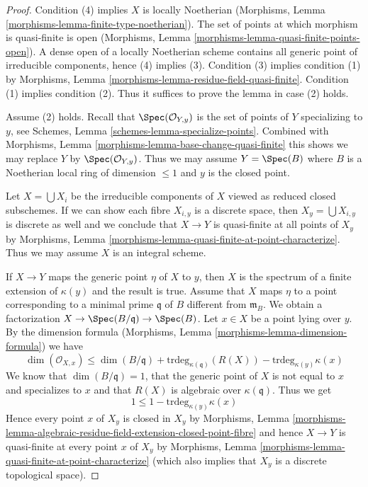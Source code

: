 \begin{proof}
Condition (4) implies $X$ is locally Noetherian
(Morphisms, Lemma \ref{morphisms-lemma-finite-type-noetherian}).
The set of points at which morphism is quasi-finite is open
(Morphisms, Lemma \ref{morphisms-lemma-quasi-finite-points-open}).
A dense open of a locally Noetherian scheme contains all generic
point of irreducible components, hence (4) implies (3).
Condition (3) implies condition
(1) by Morphisms, Lemma \ref{morphisms-lemma-residue-field-quasi-finite}.
Condition (1) implies condition (2).
Thus it suffices to prove the lemma in case (2) holds.

\medskip\noindent
Assume (2) holds. Recall that $\Spec(\mathcal{O}_{Y, y})$
is the set of points of $Y$ specializing to $y$, see
Schemes, Lemma \ref{schemes-lemma-specialize-points}.
Combined with
Morphisms, Lemma \ref{morphisms-lemma-base-change-quasi-finite}
this shows we may replace $Y$ by $\Spec(\mathcal{O}_{Y, y})$.
Thus we may assume $Y = \Spec(B)$ where $B$ is a Noetherian
local ring of dimension $\leq 1$ and $y$ is the closed point.

\medskip\noindent
Let $X = \bigcup X_i$ be the irreducible components of $X$ viewed
as reduced closed subschemes. If we can show each fibre $X_{i, y}$
is a discrete space, then $X_y = \bigcup X_{i, y}$ is discrete as
well and we conclude that $X \to Y$ is quasi-finite at all points
of $X_y$ by Morphisms, Lemma
\ref{morphisms-lemma-quasi-finite-at-point-characterize}.
Thus we may assume $X$ is an integral scheme.

\medskip\noindent
If $X \to Y$ maps the generic point $\eta$ of $X$ to $y$, then $X$
is the spectrum of a finite extension of $\kappa(y)$ and the
result is true. Assume that $X$ maps $\eta$ to a point corresponding
to a minimal prime $\mathfrak q$ of $B$ different from $\mathfrak m_B$.
We obtain a factorization $X \to \Spec(B/\mathfrak q) \to \Spec(B)$.
Let $x \in X$ be a point lying over $y$.
By the dimension formula
(Morphisms, Lemma \ref{morphisms-lemma-dimension-formula})
we have
$$
\dim(\mathcal{O}_{X, x}) \leq \dim(B/\mathfrak q) +
\text{trdeg}_{\kappa(\mathfrak q)}(R(X)) - \text{trdeg}_{\kappa(y)} \kappa(x)
$$
We know that $\dim(B/\mathfrak q) = 1$, that the generic point of $X$
is not equal to $x$ and specializes to $x$ and that $R(X)$ is algebraic
over $\kappa(\mathfrak q)$. Thus we get
$$
1 \leq 1 - \text{trdeg}_{\kappa(y)} \kappa(x)
$$
Hence every point $x$ of $X_y$ is closed in $X_y$ by
Morphisms, Lemma
\ref{morphisms-lemma-algebraic-residue-field-extension-closed-point-fibre}
and hence $X \to Y$ is quasi-finite at every point $x$ of $X_y$ by
Morphisms, Lemma \ref{morphisms-lemma-quasi-finite-at-point-characterize}
(which also implies that $X_y$ is a discrete topological space).
\end{proof}

